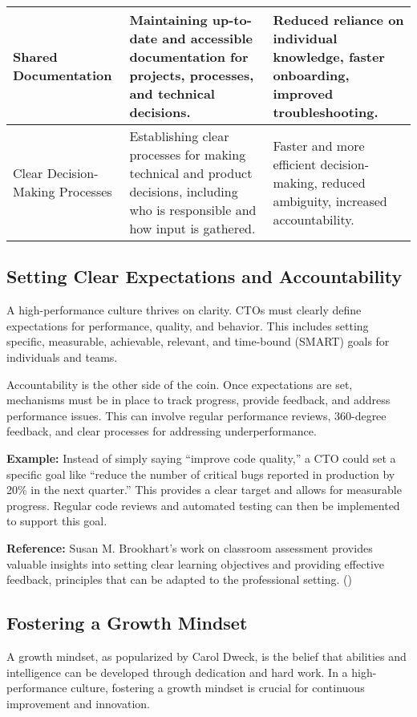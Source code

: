 \begin{longtable}{|p{4cm}|p{8cm}|p{4cm}|}
    \hline
    Shared Documentation            & Maintaining up-to-date and accessible documentation for projects, processes, and technical decisions.                            & Reduced reliance on individual knowledge, faster onboarding, improved troubleshooting.                     \\
    \hline
    Clear Decision-Making Processes & Establishing clear processes for making technical and product decisions, including who is responsible and how input is gathered. & Faster and more efficient decision-making, reduced ambiguity, increased accountability.                    \\
    \hline
\end{longtable}

\subsection{Setting Clear Expectations and Accountability}

A high-performance culture thrives on clarity. CTOs must clearly define expectations for performance, quality, and behavior. This includes setting specific, measurable, achievable, relevant, and time-bound (SMART) goals for individuals and teams.

Accountability is the other side of the coin. Once expectations are set, mechanisms must be in place to track progress, provide feedback, and address performance issues. This can involve regular performance reviews, 360-degree feedback, and clear processes for addressing underperformance.

\textbf{Example:} Instead of simply saying ``improve code quality,'' a CTO could set a specific goal like ``reduce the number of critical bugs reported in production by 20\% in the next quarter.'' This provides a clear target and allows for measurable progress. Regular code reviews and automated testing can then be implemented to support this goal.

\textbf{Reference:} Susan M. Brookhart's work on classroom assessment provides valuable insights into setting clear learning objectives and providing effective feedback, principles that can be adapted to the professional setting. (\cite{brookhart2017})

\subsection{Fostering a Growth Mindset}

A growth mindset, as popularized by Carol Dweck, is the belief that abilities and intelligence can be developed through dedication and hard work. In a high-performance culture, fostering a growth mindset is crucial for continuous improvement and innovation.

